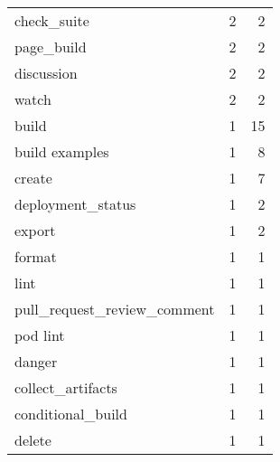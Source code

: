 \begin{tabular}{lrr}
check\_suite                 &                   2 &             2 \\
page\_build                  &                   2 &             2 \\
discussion                  &                   2 &             2 \\
watch                       &                   2 &             2 \\
build                       &                   1 &            15 \\
build examples              &                   1 &             8 \\
create                      &                   1 &             7 \\
deployment\_status           &                   1 &             2 \\
export                      &                   1 &             2 \\
format                      &                   1 &             1 \\
lint                        &                   1 &             1 \\
pull\_request\_review\_comment &                   1 &             1 \\
pod lint                    &                   1 &             1 \\
danger                      &                   1 &             1 \\
collect\_artifacts           &                   1 &             1 \\
conditional\_build           &                   1 &             1 \\
delete                      &                   1 &             1 \\
\bottomrule
\end{tabular}
